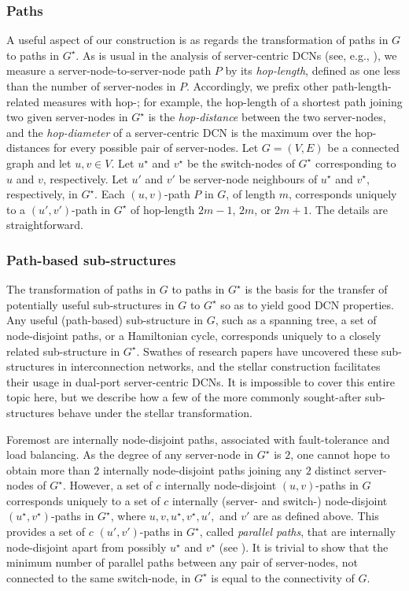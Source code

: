 \documentclass[]{amsart}
\renewcommand\ast{\star}
\begin{document}
\subsubsection{Paths}

A useful aspect of our construction is as regards the transformation of paths in $G$ to paths in
$G^\star$.  As is usual in the analysis of server-centric DCNs (see,
e.g., \cite{GuoWuTan2008,GuoChenLi2013,GuoLuLi2009,LiGuoWu2011}), we
measure a server-node-to-server-node path $P$ by its
\emph{hop-length}, defined as one less than the number of server-nodes
in $P$.  Accordingly, we prefix other path-length-related measures
with hop-; for example, the hop-length of a shortest path joining two given server-nodes in $G^\star$ is the \emph{hop-distance} between the two server-nodes, and the
\emph{hop-diameter} of a server-centric DCN is the maximum over the hop-distances for every possible pair of server-nodes.  Let $G=(V,E)$
be a connected graph and let $u,v\in V$.  Let $u^\star$ and $v^\star$ be
the switch-nodes of $G^\star$ corresponding to $u$ and $v$, respectively.
Let $u'$ and $v'$ be server-node neighbours of $u^\star$ and $v^\star$,
respectively, in $G^\star$.  Each $(u,v)$-path $P$ in $G$, of length $m$, corresponds
uniquely to a $(u',v')$-path in $G^\star$ of hop-length $2m-1$, $2m$, or
$2m+1$. The details are straightforward.

\subsubsection{Path-based sub-structures}

The transformation of paths in $G$ to paths in $G^\star$ is the basis
for the transfer of potentially useful sub-structures in $G$ to $G^\star$ so as to yield good DCN
properties.  Any useful (path-based) sub-structure in $G$, such as a spanning tree,
a set of node-disjoint paths, or a Hamiltonian cycle, corresponds uniquely
to a closely related sub-structure in $G^\star$.  Swathes of research papers have uncovered
these sub-structures in interconnection networks, and the stellar
construction facilitates their usage in dual-port server-centric DCNs.
It is impossible to cover this entire topic here, but we describe how
a few of the more commonly sought-after sub-structures behave under the
stellar transformation.

Foremost are internally node-disjoint paths, associated with fault-tolerance and load balancing.  As
the degree of any server-node in $G^\ast$ is $2$, one cannot hope to
obtain more than $2$ internally node-disjoint paths joining any $2$ distinct
server-nodes of $G^\ast$.  However, a set of $c$ internally node-disjoint
$(u,v)$-paths in $G$ corresponds uniquely to a set of $c$ internally
(server- and switch-) node-disjoint $(u^\star,v^\star)$-paths in $G^\star$, where
$u,v,u^\star,v^\star,u',$ and $v'$ are as defined above.  This provides a set
of $c$ $(u',v')$-paths in $G^\star$, called \emph{parallel paths},
that are internally node-disjoint apart from possibly $u^\star$ and
$v^\star$ (see ).  It is trivial to show that the minimum
number of parallel paths between any pair of server-nodes, not
connected to the same switch-node, in $G^\star$ is equal to the connectivity of $G$.
\end{document}

